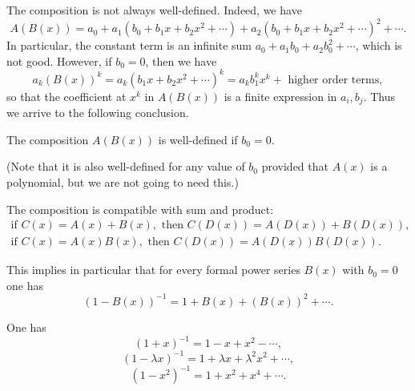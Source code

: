 \begin{page}
\setcounter{section}{2}
\setcounter{subsection}{2}
\setcounter{dfn}{5}
\label{portion:740}

The composition is not always well-defined. Indeed, we have
\[
A(B(x)) = a_0 + a_1(b_0 + b_1 x + b_2 x^2 + \cdots) + a_2(b_0 + b_1 x + b_2 x^2 + \cdots)^2 + \cdots.
\]
In particular, the constant term is an infinite sum $a_0 + a_1 b_0 + a_2 b_0^2 + \cdots$, which is not good.
However, if $b_0 = 0$, then we have
\[
a_k (B(x))^k = a_k (b_1 x + b_2 x^2 + \cdots)^k = a_k b_1^k x^k + \text{ higher order terms},
\]
so that the coefficient at $x^k$ in $A(B(x))$ is a finite expression in $a_i, b_j$.
Thus we arrive to the following conclusion.


\end{page}

\begin{page}
\setcounter{section}{2}
\setcounter{subsection}{2}
\setcounter{dfn}{6}
\label{portion:742}

\begin{lem}
The composition $A(B(x))$ is well-defined if $b_0 = 0$.
\end{lem}

\end{page}

\begin{page}
\setcounter{section}{2}
\setcounter{subsection}{2}
\setcounter{dfn}{6}
\label{portion:743}

(Note that it is also well-defined for any value of $b_0$ provided that $A(x)$ is a polynomial, but we are not going to need this.)

The composition is compatible with sum and product:
\begin{gather*}
\text{if } C(x) = A(x) + B(x), \text{ then } C(D(x)) = A(D(x)) + B(D(x)),\\
\text{if } C(x) = A(x)B(x), \text{ then } C(D(x)) = A(D(x))B(D(x)).
\end{gather*}

This implies in particular that for every formal power series $B(x)$ with $b_0 = 0$ one has
\[
(1 - B(x))^{-1} = 1 + B(x) + (B(x))^2 + \cdots.
\]


\end{page}

\begin{page}
\setcounter{section}{2}
\setcounter{subsection}{2}
\setcounter{dfn}{7}
\label{portion:745}

\begin{exl}
One has
\[
(1 + x)^{-1} = 1 - x + x^2 - \cdots,
\]
\[
(1 - \lambda x)^{-1} = 1 + \lambda x + \lambda^2 x^2 + \cdots,
\]
\[
(1 - x^2)^{-1} = 1 + x^2 + x^4 + \cdots.
\]
\end{exl}

\end{page}

